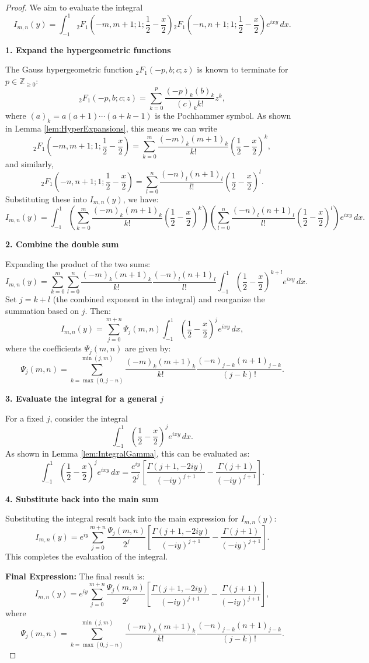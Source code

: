 \documentclass[12pt]{article}
\begin{document}
\begin{proof}
We aim to evaluate the integral  
\[
I_{m,n}(y) = \int_{-1}^1 {}_2F_1\left(-m, m+1; 1; \frac{1}{2} - \frac{x}{2}\right)
{}_2F_1\left(-n, n+1; 1; \frac{1}{2} - \frac{x}{2}\right) e^{i x y} \, dx.
\]  

\textbf{1. Expand the hypergeometric functions}

The Gauss hypergeometric function ${}_2F_1(-p, b; c; z)$ is known to terminate for $p \in \mathbb{Z}_{\geq 0}$:
\[
{}_2F_1(-p, b; c; z) = \sum_{k=0}^p \frac{(-p)_k (b)_k}{(c)_k k!} z^k,
\]
where $(a)_k = a(a+1)\cdots(a+k-1)$ is the Pochhammer symbol.
As shown in Lemma \ref{lem:HyperExpansions}, this means we can write
\[
{}_2F_1\left(-m, m+1; 1; \frac{1}{2} - \frac{x}{2}\right) = \sum_{k=0}^m \frac{(-m)_k (m+1)_k}{k!} \left(\frac{1}{2} - \frac{x}{2}\right)^k,
\]
and similarly,
\[
{}_2F_1\left(-n, n+1; 1; \frac{1}{2} - \frac{x}{2}\right) = \sum_{l=0}^n \frac{(-n)_l (n+1)_l}{l!} \left(\frac{1}{2} - \frac{x}{2}\right)^l.
\]
Substituting these into $I_{m,n}(y)$, we have:
\[
I_{m,n}(y) = \int_{-1}^1 \left( \sum_{k=0}^m \frac{(-m)_k (m+1)_k}{k!} \left(\frac{1}{2} - \frac{x}{2}\right)^k \right) 
\left( \sum_{l=0}^n \frac{(-n)_l (n+1)_l}{l!} \left(\frac{1}{2} - \frac{x}{2}\right)^l \right) e^{i x y} \, dx.
\]

\textbf{2. Combine the double sum}

Expanding the product of the two sums:
\[
I_{m,n}(y) = \sum_{k=0}^m \sum_{l=0}^n \frac{(-m)_k (m+1)_k}{k!} \frac{(-n)_l (n+1)_l}{l!} 
\int_{-1}^1 \left(\frac{1}{2} - \frac{x}{2}\right)^{k+l} e^{i x y} \, dx.
\]
Set $j = k + l$ (the combined exponent in the integral) and reorganize the summation based on $j$. Then:
\[
I_{m,n}(y) = \sum_{j=0}^{m+n} \Psi_j(m, n) \int_{-1}^1 \left(\frac{1}{2} - \frac{x}{2}\right)^j e^{i x y} \, dx,
\]
where the coefficients $\Psi_j(m, n)$ are given by:
\[
\Psi_j(m,n) = \sum_{k=\max(0, j-n)}^{\min(j, m)} 
\frac{(-m)_k (m+1)_k}{k!} 
\frac{(-n)_{j-k} (n+1)_{j-k}}{(j-k)!}.
\]

\textbf{3. Evaluate the integral for a general $j$}

For a fixed $j$, consider the integral
\[
\int_{-1}^1 \left(\frac{1}{2} - \frac{x}{2}\right)^j e^{i x y} \, dx.
\]
As shown in Lemma \ref{lem:IntegralGamma}, this can be evaluated as:
\[
\int_{-1}^1 \left(\frac{1}{2} - \frac{x}{2}\right)^j e^{i x y} \, dx 
= \frac{e^{iy}}{2^j} \left[\frac{\Gamma(j+1, -2iy)}{(-iy)^{j+1}} - \frac{\Gamma(j+1)}{(-iy)^{j+1}}\right].
\]

\textbf{4. Substitute back into the main sum}

Substituting the integral result back into the main expression for $I_{m,n}(y)$:
\[
I_{m,n}(y) = e^{iy} \sum_{j=0}^{m+n} \frac{\Psi_j(m, n)}{2^j} 
\left[\frac{\Gamma(j+1, -2iy)}{(-iy)^{j+1}} - \frac{\Gamma(j+1)}{(-iy)^{j+1}}\right].
\]
This completes the evaluation of the integral.

\textbf{Final Expression:}
The final result is:
\[
I_{m,n}(y) = e^{iy} \sum_{j=0}^{m+n} \frac{\Psi_j(m, n)}{2^j} 
\left[\frac{\Gamma(j+1, -2iy)}{(-iy)^{j+1}} - \frac{\Gamma(j+1)}{(-iy)^{j+1}}\right],
\]
where
\[
\Psi_j(m,n) = \sum_{k = \max(0, j-n)}^{\min(j, m)} 
\frac{(-m)_k (m+1)_k}{k!} 
\frac{(-n)_{j-k} (n+1)_{j-k}}{(j-k)!}.
\]
\end{proof}
\end{document}
